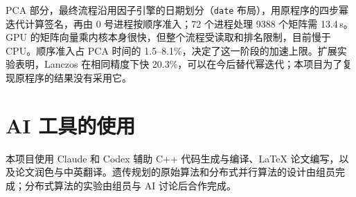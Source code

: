\documentclass[11pt,a4paper,UTF8,fontset=fandol]{ctexart}
\newcommand{\code}[1]{\texttt{#1}}
\begin{document}
PCA 部分，最终流程沿用因子引擎的日期划分（\code{date} 布局），用原程序的四步幂迭代计算签名，再由 0 号进程按顺序准入；72 个进程处理 9388 个矩阵需 13.4\,s。GPU 的矩阵向量乘内核本身很快，但整个流程受读取和排名限制，目前慢于 CPU。顺序准入占 PCA 时间的 1.5--8.1\%，决定了这一阶段的加速上限。扩展实验表明，Lanczos 在相同精度下快 20.3\%，可以在今后替代幂迭代；本项目为了复现原程序的结果没有采用它。

\section*{AI 工具的使用}
本项目使用 Claude 和 Codex 辅助 C++ 代码生成与编译、LaTeX 论文编写，以及论文润色与中英翻译。遗传规划的原始算法和分布式并行算法的设计由组员完成；分布式算法的实验由组员与 AI 讨论后合作完成。
\clearpage

\appendix
\end{document}
